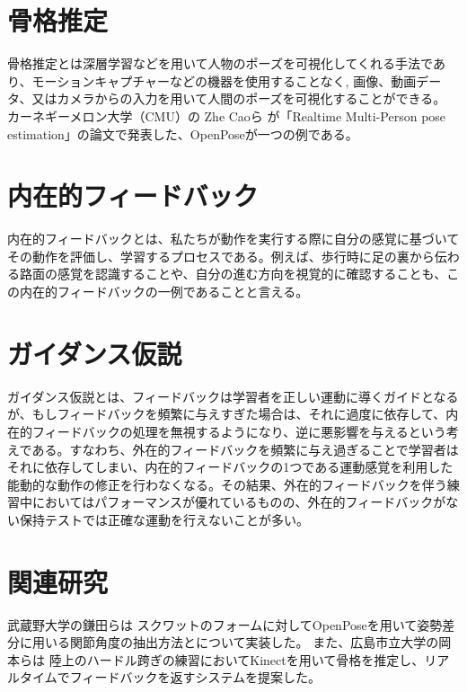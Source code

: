 \section{骨格推定}
骨格推定とは深層学習などを用いて人物のポーズを可視化してくれる手法であり、モーションキャプチャーなどの機器を使用することなく,
画像、動画データ、又はカメラからの入力を用いて人間のポーズを可視化することができる。
カーネギーメロン大学（CMU）の Zhe Caoら が「Realtime Multi-Person pose estimation」\cite{openpose}の論文で発表した、OpenPoseが一つの例である。

\section{内在的フィードバック}
内在的フィードバックとは、私たちが動作を実行する際に自分の感覚に基づいてその動作を評価し、学習するプロセスである。例えば、歩行時に足の裏から伝わる路面の感覚を認識することや、自分の進む方向を視覚的に確認することも、この内在的フィードバックの一例であることと言える。\cite{nagoyahml_feedback}
\section{ガイダンス仮説}
ガイダンス仮説とは、フィードバックは学習者を正しい運動に導くガイドとなるが、もしフィードバックを頻繁に与えすぎた場合は、それに過度に依存して、内在的フィードバックの処理を無視するようになり、逆に悪影響を与えるという考えである。すなわち、外在的フィードバックを頻繁に与え過ぎることで学習者はそれに依存してしまい、内在的フィードバックの1つである運動感覚を利用した能動的な動作の修正を行わなくなる。その結果、外在的フィードバックを伴う練習中においてはパフォーマンスが優れているものの、外在的フィードバックがない保持テストでは正確な運動を行えないことが多い。
\section{関連研究}
武蔵野大学の鎌田らは \cite{Relatedresearch1}スクワットのフォームに対してOpenPoseを用いて姿勢差分に用いる関節角度の抽出方法とについて実装した。
また、広島市立大学の岡本らは \cite{Relatedresearch2}陸上のハードル跨ぎの練習においてKinectを用いて骨格を推定し、リアルタイムでフィードバックを返すシステムを提案した。